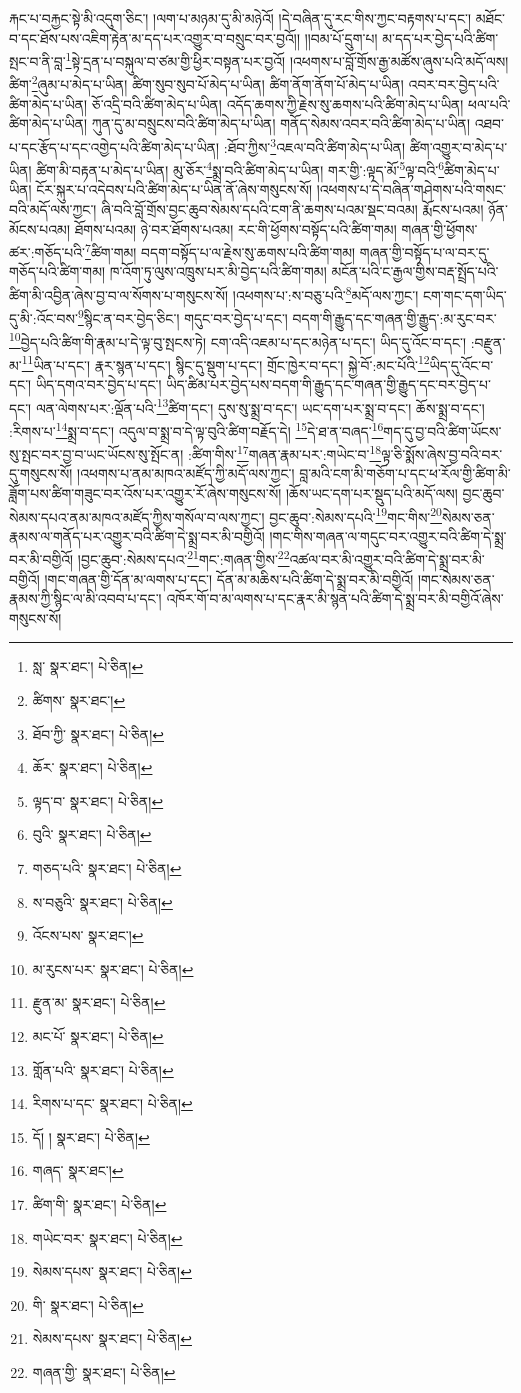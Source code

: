 རྐང་པ་བརྐྱང་སྟེ་མི་འདུག་ཅིང་། །ལག་པ་མཉམ་དུ་མི་མཉེའོ། །དེ་བཞིན་དུ་རང་གིས་ཀྱང་བརྟགས་པ་དང་། མཐོང་བ་དང་ཐོས་པས་འཇིག་རྟེན་མ་དད་པར་འགྱུར་བ་བསྲུང་བར་བྱའོ།། །།བམ་པོ་དྲུག་པ། མ་དད་པར་བྱེད་པའི་ཚིག་སྤང་བ་ནི་བླ་\footnote{སླ་  སྣར་ཐང་།  པེ་ཅིན། }སྟེ་དྲན་པ་བསྐུལ་བ་ཙམ་གྱི་ཕྱིར་བསྟན་པར་བྱའོ། །འཕགས་པ་བློ་གྲོས་རྒྱ་མཚོས་ཞུས་པའི་མདོ་ལས། ཚིག་\footnote{ཚིགས་  སྣར་ཐང་། }ཞུམ་པ་མེད་པ་ཡིན། ཚིག་སུབ་སུབ་པོ་མེད་པ་ཡིན། ཚིག་ནོག་ནོག་པོ་མེད་པ་ཡིན། འབར་བར་བྱེད་པའི་ཚིག་མེད་པ་ཡིན། ཅོ་འདྲི་བའི་ཚིག་མེད་པ་ཡིན། འདོད་ཆགས་ཀྱི་རྗེས་སུ་ཆགས་པའི་ཚིག་མེད་པ་ཡིན། ཕལ་པའི་ཚིག་མེད་པ་ཡིན། ཀུན་དུ་མ་བསྲུངས་བའི་ཚིག་མེད་པ་ཡིན། གནོད་སེམས་འབར་བའི་ཚིག་མེད་པ་ཡིན། འཐབ་པ་དང་རྩོད་པ་དང་འགྱེད་པའི་ཚིག་མེད་པ་ཡིན། :ཐོབ་ཀྱིས་\footnote{ཐོབ་ཀྱི་  སྣར་ཐང་།  པེ་ཅིན། }འཇལ་བའི་ཚིག་མེད་པ་ཡིན། ཚིག་འགྱུར་བ་མེད་པ་ཡིན། ཚིག་མི་བརྟན་པ་མེད་པ་ཡིན། མུ་ཅོར་\footnote{ཆོར་  སྣར་ཐང་།  པེ་ཅིན། }སྨྲ་བའི་ཚིག་མེད་པ་ཡིན། གར་གྱི་:ལྟད་མོ་\footnote{ལྟད་བ་  སྣར་ཐང་།  པེ་ཅིན། }ལྟ་བའི་\footnote{བུའི་  སྣར་ཐང་།  པེ་ཅིན། }ཚིག་མེད་པ་ཡིན། ངོར་སྐུར་པ་འདེབས་པའི་ཚིག་མེད་པ་ཡིན་ནོ་ཞེས་གསུངས་སོ། །འཕགས་པ་དེ་བཞིན་གཤེགས་པའི་གསང་བའི་མདོ་ལས་ཀྱང་། ཞི་བའི་བློ་གྲོས་བྱང་ཆུབ་སེམས་དཔའི་ངག་ནི་ཆགས་པའམ་སྡང་བའམ། རྨོངས་པའམ། ཉོན་མོངས་པའམ། ཐོགས་པའམ། ཉེ་བར་ཐོགས་པའམ། རང་གི་ཕྱོགས་བསྟོད་པའི་ཚིག་གམ། གཞན་གྱི་ཕྱོགས་ཚར་:གཅོད་པའི་\footnote{གཅད་པའི་  སྣར་ཐང་།  པེ་ཅིན། }ཚིག་གམ། བདག་བསྟོད་པ་ལ་རྗེས་སུ་ཆགས་པའི་ཚིག་གམ། གཞན་གྱི་བསྟོད་པ་ལ་བར་དུ་གཅོད་པའི་ཚིག་གམ། ཁ་འོག་ཏུ་ལུས་འཁྲུས་པར་མི་བྱེད་པའི་ཚིག་གམ། མངོན་པའི་ང་རྒྱལ་གྱིས་བརྡ་སྤྲོད་པའི་ཚིག་མི་འབྱིན་ཞེས་བྱ་བ་ལ་སོགས་པ་གསུངས་སོ། །འཕགས་པ་:ས་བཅུ་པའི་\footnote{ས་བཅུའི་  སྣར་ཐང་།  པེ་ཅིན། }མདོ་ལས་ཀྱང་། ངག་གང་དག་ཡིད་དུ་མི་:འོང་བས་\footnote{འོངས་པས་  སྣར་ཐང་། }སྙིང་ན་བར་བྱེད་ཅིང་། གདུང་བར་བྱེད་པ་དང་། བདག་གི་རྒྱུད་དང་གཞན་གྱི་རྒྱུད་:མ་རུང་བར་\footnote{མ་རུངས་པར་  སྣར་ཐང་།  པེ་ཅིན། }བྱེད་པའི་ཚིག་གི་རྣམ་པ་དེ་ལྟ་བུ་སྤངས་ཏེ། ངག་འདི་འཇམ་པ་དང་མཉེན་པ་དང་། ཡིད་དུ་འོང་བ་དང་། :བརྫུན་མ་\footnote{རྫུན་མ་  སྣར་ཐང་།  པེ་ཅིན། }ཡིན་པ་དང་། རྣར་སྙན་པ་དང་། སྙིང་དུ་སྡུག་པ་དང་། གྲོང་ཁྱེར་བ་དང་། སྐྱེ་བོ་:མང་པོའི་\footnote{མང་པོ་  སྣར་ཐང་།  པེ་ཅིན། }ཡིད་དུ་འོང་བ་དང་། ཡིད་དགའ་བར་བྱེད་པ་དང་། ཡིད་ཚིམ་པར་བྱེད་པས་བདག་གི་རྒྱུད་དང་གཞན་གྱི་རྒྱུད་དང་བར་བྱེད་པ་དང་། ལན་ལེགས་པར་:ལྡོན་པའི་\footnote{གློན་པའི་  སྣར་ཐང་།  པེ་ཅིན། }ཚིག་དང་། དུས་སུ་སྨྲ་བ་དང་། ཡང་དག་པར་སྨྲ་བ་དང་། ཆོས་སྨྲ་བ་དང་། :རིགས་པ་\footnote{རིགས་པ་དང་  སྣར་ཐང་།  པེ་ཅིན། }སྨྲ་བ་དང་། འདུལ་བ་སྨྲ་བ་དེ་ལྟ་བུའི་ཚིག་བརྗོད་དེ། \footnote{དོ། །   སྣར་ཐང་།  པེ་ཅིན། }དེ་ཐ་ན་བཞད་\footnote{གཞད་  སྣར་ཐང་། }གད་དུ་བྱ་བའི་ཚིག་ཡོངས་སུ་སྤང་བར་བྱ་བ་ཡང་ཡོངས་སུ་སྤོང་ན། :ཚིག་གིས་\footnote{ཚིག་གི་  སྣར་ཐང་།  པེ་ཅིན། }གཞན་རྣམ་པར་:གཡེང་བ་\footnote{གཡེང་བར་  སྣར་ཐང་།  པེ་ཅིན། }ལྟ་ཅི་སྨོས་ཞེས་བྱ་བའི་བར་དུ་གསུངས་སོ། །འཕགས་པ་ནམ་མཁའ་མཛོད་ཀྱི་མདོ་ལས་ཀྱང་། བླ་མའི་ངག་མི་གཅོག་པ་དང་ཕ་རོལ་གྱི་ཚིག་མི་ཟློག་པས་ཚིག་གཟུང་བར་འོས་པར་འགྱུར་རོ་ཞེས་གསུངས་སོ། །ཆོས་ཡང་དག་པར་སྡུད་པའི་མདོ་ལས། བྱང་ཆུབ་སེམས་དཔའ་ནམ་མཁའ་མཛོད་ཀྱིས་གསོལ་བ་ལས་ཀྱང་། བྱང་ཆུབ་:སེམས་དཔའི་\footnote{སེམས་དཔས་  སྣར་ཐང་།  པེ་ཅིན། }གང་གིས་\footnote{གི་  སྣར་ཐང་།  པེ་ཅིན། }སེམས་ཅན་རྣམས་ལ་གནོད་པར་འགྱུར་བའི་ཚིག་དེ་སྨྲ་བར་མི་བགྱིའོ། །གང་གིས་གཞན་ལ་གདུང་བར་འགྱུར་བའི་ཚིག་དེ་སྨྲ་བར་མི་བགྱིའོ། །བྱང་ཆུབ་:སེམས་དཔའ་\footnote{སེམས་དཔས་  སྣར་ཐང་།  པེ་ཅིན། }གང་:གཞན་གྱིས་\footnote{གཞན་གྱི་  སྣར་ཐང་།  པེ་ཅིན། }འཚལ་བར་མི་འགྱུར་བའི་ཚིག་དེ་སྨྲ་བར་མི་བགྱིའོ། །གང་གཞན་གྱི་དོན་མ་ལགས་པ་དང་། དོན་མ་མཆིས་པའི་ཚིག་དེ་སྨྲ་བར་མི་བགྱིའོ། །གང་སེམས་ཅན་རྣམས་ཀྱི་སྙིང་ལ་མི་འབབ་པ་དང་། འཁོར་གོ་བ་མ་ལགས་པ་དང་རྣར་མི་སྙན་པའི་ཚིག་དེ་སྨྲ་བར་མི་བགྱིའོ་ཞེས་གསུངས་སོ། 